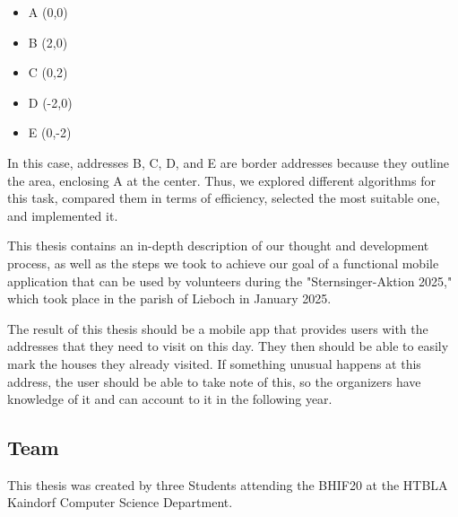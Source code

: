     \begin{itemize}
        \item A (0,0)
        \item B (2,0)
        \item C (0,2)
        \item D (-2,0)
        \item E (0,-2)
    \end{itemize}


In this case, addresses B, C, D, and E are border addresses because they outline the area, enclosing A at the center.
 Thus, we explored different algorithms for this task, compared them in terms of efficiency, selected the most suitable one, and implemented it.

\blankLine

This thesis contains an in-depth description of our thought and development process, as well as the steps we took to achieve our goal of a functional mobile application that can be used by volunteers during the "Sternsinger-Aktion 2025," which took place in the parish of Lieboch in January 2025.

\blankLine

The result of this thesis should be a mobile app that provides users with the addresses that they need to visit on this day. They then should be able to easily mark the houses they already visited. If something unusual happens at this address, the user should be able to take note of this, so the organizers have knowledge of it and can account to it in the following year.

\newpage

\subsection{Team}

This thesis was created by three Students attending the BHIF20 at the
HTBLA Kaindorf Computer Science Department.

\blankLine


